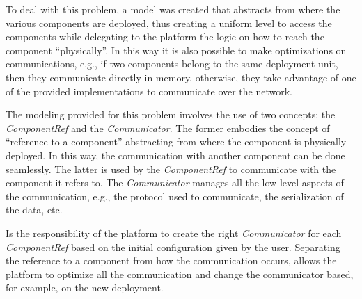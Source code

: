 To deal with this problem, a model was created that abstracts from where the various components are deployed, thus creating a uniform level
to access the components while delegating to the platform the logic on how to reach the component ``physically''. In this way it is also possible
to make optimizations on communications, e.g., if two components belong to the same deployment unit, then they communicate directly in memory,
otherwise, they take advantage of one of the provided implementations to communicate over the network.

The modeling provided for this problem involves the use of two concepts: the \emph{ComponentRef} and the \emph{Communicator}.
The former embodies the concept of ``reference to a component'' abstracting from where the component is physically deployed. In this way, the
communication with another component can be done seamlessly.
The latter is used by the \emph{ComponentRef} to communicate with the component it refers to. The \emph{Communicator} manages all the low level
aspects of the communication, e.g., the protocol used to communicate, the serialization of the data, etc.

Is the responsibility of the platform to create the right \emph{Communicator} for each \emph{ComponentRef} based on the initial configuration given
by the user. Separating the reference to a component from how the communication occurs, allows the platform to optimize all the communication and 
change the communicator based, for example, on the new deployment.
